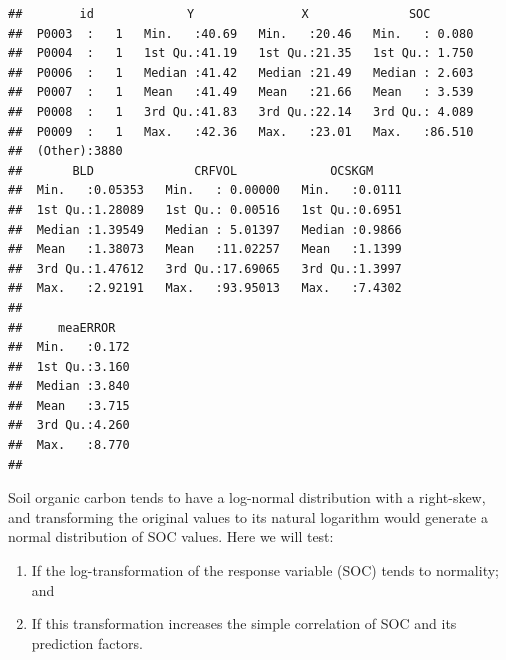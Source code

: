 \documentclass[10pt,b5paper,]{book}
\newenvironment{Shaded}{\begin{snugshade}}{\end{snugshade}}
\newcommand{\CommentTok}[1]{\textcolor[rgb]{0.56,0.35,0.01}{\textit{#1}}}
\newcommand{\DataTypeTok}[1]{\textcolor[rgb]{0.13,0.29,0.53}{#1}}
\newcommand{\DecValTok}[1]{\textcolor[rgb]{0.00,0.00,0.81}{#1}}
\newcommand{\KeywordTok}[1]{\textcolor[rgb]{0.13,0.29,0.53}{\textbf{#1}}}
\newcommand{\NormalTok}[1]{#1}
\newcommand{\OperatorTok}[1]{\textcolor[rgb]{0.81,0.36,0.00}{\textbf{#1}}}
\newcommand{\StringTok}[1]{\textcolor[rgb]{0.31,0.60,0.02}{#1}}
\providecommand{\tightlist}{%
  \setlength{\itemsep}{0pt}\setlength{\parskip}{0pt}}
\theoremstyle{definition}
\theoremstyle{definition}
\theoremstyle{definition}
\theoremstyle{remark}
\begin{document}
\begin{verbatim}
##        id             Y               X              SOC        
##  P0003  :   1   Min.   :40.69   Min.   :20.46   Min.   : 0.080  
##  P0004  :   1   1st Qu.:41.19   1st Qu.:21.35   1st Qu.: 1.750  
##  P0006  :   1   Median :41.42   Median :21.49   Median : 2.603  
##  P0007  :   1   Mean   :41.49   Mean   :21.66   Mean   : 3.539  
##  P0008  :   1   3rd Qu.:41.83   3rd Qu.:22.14   3rd Qu.: 4.089  
##  P0009  :   1   Max.   :42.36   Max.   :23.01   Max.   :86.510  
##  (Other):3880                                                   
##       BLD              CRFVOL             OCSKGM      
##  Min.   :0.05353   Min.   : 0.00000   Min.   :0.0111  
##  1st Qu.:1.28089   1st Qu.: 0.00516   1st Qu.:0.6951  
##  Median :1.39549   Median : 5.01397   Median :0.9866  
##  Mean   :1.38073   Mean   :11.02257   Mean   :1.1399  
##  3rd Qu.:1.47612   3rd Qu.:17.69065   3rd Qu.:1.3997  
##  Max.   :2.92191   Max.   :93.95013   Max.   :7.4302  
##                                                       
##     meaERROR    
##  Min.   :0.172  
##  1st Qu.:3.160  
##  Median :3.840  
##  Mean   :3.715  
##  3rd Qu.:4.260  
##  Max.   :8.770  
## 
\end{verbatim}

Soil organic carbon tends to have a log-normal distribution with a
right-skew, and transforming the original values to its natural
logarithm would generate a normal distribution of SOC values. Here we
will test:

\begin{enumerate}
\def\labelenumi{\arabic{enumi}.}
\tightlist
\item
  If the log-transformation of the response variable (SOC) tends to
  normality; and
\item
  If this transformation increases the simple correlation of SOC and its
  prediction factors.
\end{enumerate}

\begin{Shaded}
\end{Shaded}
\end{document}
